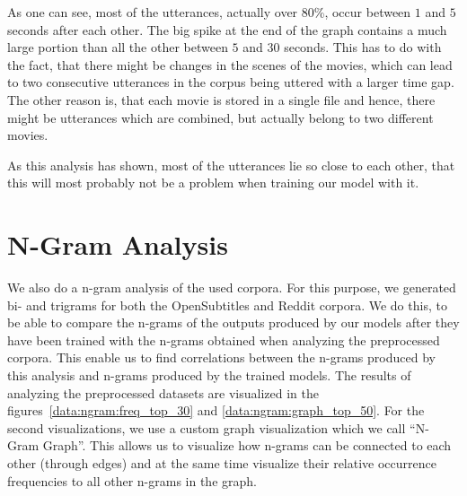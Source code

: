 As one can see, most of the utterances, actually over 80\%, occur between $1$ and $5$ seconds after each other. The big spike at the end of the graph contains a much large portion than all the other between $5$ and $30$ seconds. This has to do with the fact, that there might be changes in the scenes of the movies, which can lead to two consecutive utterances in the corpus being uttered with a larger time gap. The other reason is, that each movie is stored in a single file and hence, there might be utterances which are combined, but actually belong to two different movies.

As this analysis has shown, most of the utterances lie so close to each other, that this will most probably not be a problem when training our model with it.

\section{N-Gram Analysis}
We also do a n-gram analysis of the used corpora. For this purpose, we generated bi- and trigrams for both the OpenSubtitles and Reddit corpora. We do this, to be able to compare the n-grams of the outputs produced by our models after they have been trained with the n-grams obtained when analyzing the preprocessed corpora. This enable us to find correlations between the n-grams produced by this analysis and n-grams produced by the trained models. The results of analyzing the preprocessed datasets are visualized in the figures~\ref{data:ngram:freq_top_30} and \ref{data:ngram:graph_top_50}. For the second visualizations, we use a custom graph visualization which we call ``N-Gram Graph''. This allows us to visualize how n-grams can be connected to each other (through edges) and at the same time visualize their relative occurrence frequencies to all other n-grams in the graph.
 
